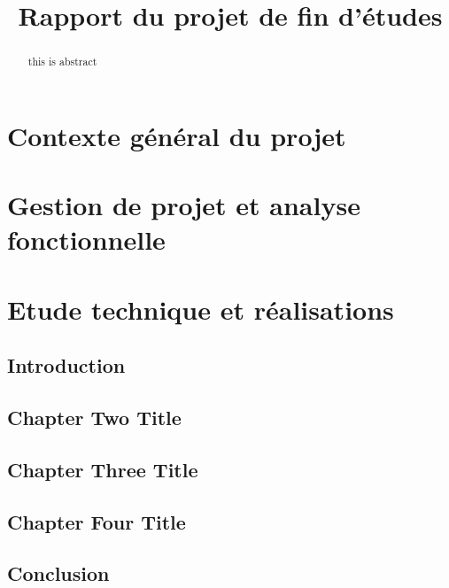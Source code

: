 \documentclass[a4paper, french, 12pt]{report}
\title{Rapport du projet de fin d'études}\let\title\@title
\begin{document}
\begin{titlepage}
  
\end{titlepage}

\renewcommand{\abstractname}{Résumé}
\begin{abstract}
  
\end{abstract}

\renewcommand{\abstractname}{Abstract}
\begin{abstract}
  this is abstract
\end{abstract}

\tableofcontents
\part{Contexte général du projet}
\part{Gestion de projet et analyse fonctionnelle}
\part{Etude technique et réalisations}

\chapter{Introduction}


\chapter{Chapter Two Title}


\chapter{Chapter Three Title}


\chapter{Chapter Four Title}


\chapter{Conclusion}

\end{document}
